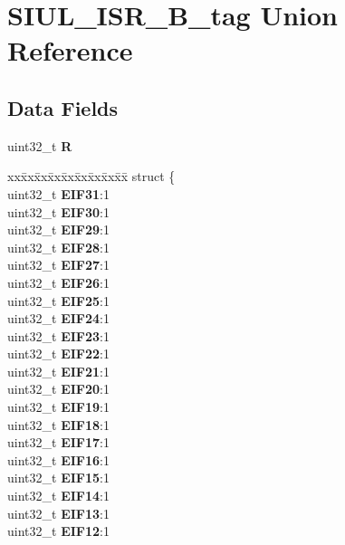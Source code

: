 \hypertarget{unionSIUL__ISR__32B__tag}{}\section{S\+I\+U\+L\+\_\+\+I\+S\+R\+\_\+B\+\_\+tag Union Reference}
\label{unionSIUL__ISR__32B__tag}
\subsection*{Data Fields}
\begin{DoxyCompactItemize}
\item 
\mbox{\label{unionSIUL__ISR__32B__tag_aa951f375671311e523885714d87ef7e1}} 
uint32\+\_\+t {\bfseries R}
\item 
\mbox{\label{unionSIUL__ISR__32B__tag_a5156abb157c504d9a95f024e0c7d927f}} 
\begin{tabbing}
xx\=xx\=xx\=xx\=xx\=xx\=xx\=xx\=xx\=\kill
struct \{\\
\>uint32\_t {\bfseries EIF31}:1\\
\>uint32\_t {\bfseries EIF30}:1\\
\>uint32\_t {\bfseries EIF29}:1\\
\>uint32\_t {\bfseries EIF28}:1\\
\>uint32\_t {\bfseries EIF27}:1\\
\>uint32\_t {\bfseries EIF26}:1\\
\>uint32\_t {\bfseries EIF25}:1\\
\>uint32\_t {\bfseries EIF24}:1\\
\>uint32\_t {\bfseries EIF23}:1\\
\>uint32\_t {\bfseries EIF22}:1\\
\>uint32\_t {\bfseries EIF21}:1\\
\>uint32\_t {\bfseries EIF20}:1\\
\>uint32\_t {\bfseries EIF19}:1\\
\>uint32\_t {\bfseries EIF18}:1\\
\>uint32\_t {\bfseries EIF17}:1\\
\>uint32\_t {\bfseries EIF16}:1\\
\>uint32\_t {\bfseries EIF15}:1\\
\>uint32\_t {\bfseries EIF14}:1\\
\>uint32\_t {\bfseries EIF13}:1\\
\>uint32\_t {\bfseries EIF12}:1\\

\end{tabbing}
\end{DoxyCompactItemize}

